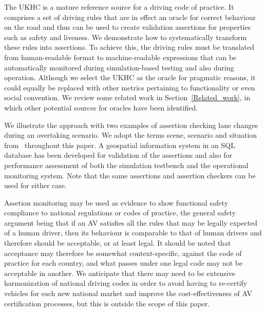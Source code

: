 The UKHC is a mature reference source for a driving code of practice. It comprises a set of driving rules that are in effect an oracle for correct behaviour on the road and thus can be used to create validation assertions for properties such as safety and liveness. 
%
We demonstrate how to systematically transform these rules into assertions. To achieve this, the driving rules must be translated from human-readable format to machine-readable expressions that can be automatically monitored during simulation-based testing and also during operation. Although we select the UKHC as the oracle for pragmatic reasons, it could equally be replaced with other metrics pertaining to functionality or even social convention. We review some related work in Section~\ref{Related_work}, in which other potential sources for oracles have been identified.
%
%

%
We illustrate the approach with two examples of assertion checking lane changes during an overtaking scenario. We adopt the terms scene, scenario and situation from~\cite{Ulbrich2015} throughout this paper. 
A geospatial information system in an SQL database has been developed for validation of the assertions and also for performance assessment of both the simulation testbench and the operational monitoring system. Note that the same assertions and assertion checkers can be used for either case.
%


Assetion monitoring may be used as evidence to show functional safety compliance to national regulations or codes of practice, the general safety argument being that if an AV satisfies all the rules that may be legally expected of a human driver, then its behaviour is comparable to that of human drivers and therefore should be acceptable, or at least legal. It should be noted that acceptance may therefore be somewhat context-specific, against the code of practice for each country, and what passes under one legal code may not be acceptable in another. We anticipate that there may need to be extensive harmonization of national driving codes in order to avoid having to re-certify vehicles for each new national market and improve the cost-effectiveness of AV certification processes, but this is outside the scope of this paper.

